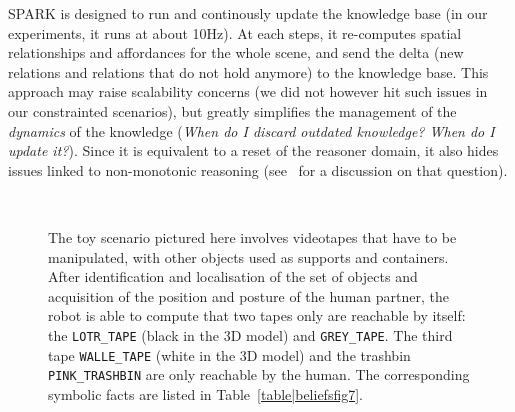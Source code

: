 \documentclass[preprint,3p,times]{elsarticle}
\newcommand{\concept}[1]{{\small \texttt{#1}}}
\begin{document}
SPARK is designed to run and continously update the knowledge base (in our
experiments, it runs at about 10Hz). At each steps, it re-computes spatial
relationships and affordances for the whole scene, and send the delta (new
relations and relations that do not hold anymore) to the knowledge base. This
approach may raise scalability concerns (we did not however hit such issues in
our constrainted scenarios), but greatly simplifies the management of the
\emph{dynamics} of the knowledge (\emph{When do I discard outdated knowledge?
When do I update it?}). Since it is equivalent to a reset of the reasoner
domain, it also hides issues linked to non-monotonic reasoning
(see~\cite{McCarthy2007} for a discussion on that question).


\begin{figure}[ht!]
   \begin{center}
%
       \\ %
%
   \end{center}

   \caption{The toy scenario pictured here involves videotapes that have to be
       manipulated, with other objects used as supports and containers.  After
       identification and localisation of the set of objects and acquisition of
       the position and posture of the human partner, the robot is able to
       compute that two tapes only are reachable by itself: the
       \concept{LOTR\_TAPE} (black in the 3D model) and \concept{GREY\_TAPE}.
       The third tape \concept{WALLE\_TAPE} (white in the 3D model) and the
   trashbin \concept{PINK\_TRASHBIN} are only reachable by the human. The
   corresponding symbolic facts are listed in Table~\ref{table|beliefsfig7}.  }%
 
 \label{fig:sparkSubfigures}

\end{figure}
\end{document}
